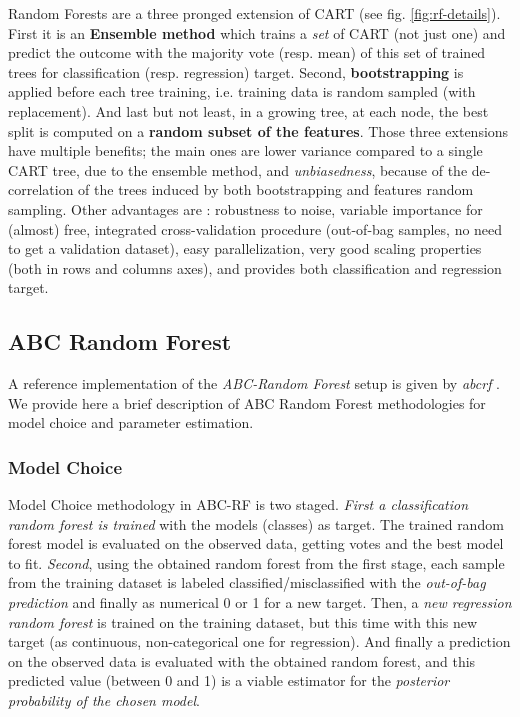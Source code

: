\documentclass[long, final]{jobim}
\begin{document}
Random Forests \cite{breiman:2001} are a three pronged extension of CART (see fig. \ref{fig:rf-details}). First it is an \textbf{Ensemble method} which trains a \emph{set} of CART (not just one) and predict  the outcome with the  majority vote (resp. mean) of this set of trained trees for classification (resp. regression) target. Second, \textbf{bootstrapping} is applied before each tree training, i.e. training data is random sampled (with replacement). And last but not least, in a growing tree, at each node, the best split is computed on a \textbf{random subset of the features}. Those three extensions have multiple benefits; the main ones are lower variance compared to a single CART tree, due to the ensemble method, and \emph{unbiasedness}, because of the de-correlation of the trees induced by both bootstrapping and features random sampling. Other advantages are : robustness to noise, variable importance for (almost) free, integrated cross-validation procedure (out-of-bag samples, no need to get a validation dataset), easy parallelization, very good scaling properties (both in rows and columns axes), and provides both classification and regression target. 

\subsection{ABC Random Forest}
\label{sec:abcrf}

A reference implementation of the \emph{ABC-Random Forest} setup is given by \emph{abcrf} \cite{marinraynal2019abcrf}. We provide here a brief description of ABC Random Forest methodologies for model choice and parameter estimation.

\subsubsection{Model Choice}
\label{sec:abcrf-modelchoice}

Model Choice methodology in ABC-RF is two staged. \emph{First a classification random forest is trained} with the models (classes) as target. The trained random forest model is evaluated on the observed data, getting votes and the best model to fit. \emph{Second}, using the obtained random forest from the first stage, each sample from the training dataset is labeled classified/misclassified with the \emph{out-of-bag prediction} and finally as numerical 0 or 1 for a new target. Then, a \emph{new regression random forest} is trained on the training dataset, but this time with this new target (as continuous, non-categorical one for regression). And finally a prediction on the observed data is evaluated with the obtained random forest, and this predicted value (between 0 and 1) is a viable estimator for the \emph{posterior probability of the chosen model}.
\end{document}
